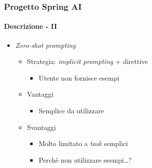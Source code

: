 %
\begin{frame}[t,fragile] \frametitle{Progetto Spring AI}
    \framesubtitle{Descrizione - II}
    {\small
        \begin{itemize}[leftmargin=10pt,align=right]
            \item[\alertedcircled{2}] \textit{Zero-shot prompting}
            \begin{itemize}[leftmargin=10pt,align=right]
                \item[\alert{\faArrowCircleRight}] Strategia: \textit{implicit prompting} + direttive
                \begin{itemize}[leftmargin=10pt,align=right]
                    \item[\alert{\faArrowCircleRight}] Utente \alert{non} fornisce esempi
                \end{itemize}
                \item[\alert{\faArrowCircleRight}] Vantaggi
                \begin{itemize}[leftmargin=10pt,align=right]
                    \item[\alert{\faArrowCircleRight}] Semplice da utilizzare
                \end{itemize}
                \item[\alert{\faArrowCircleRight}] Svantaggi
                \begin{itemize}[leftmargin=10pt,align=right]
                    \item[\alert{\faArrowCircleRight}] Molto limitato a \textit{task} semplici
                    \item[\alert{\faArrowCircleRight}] Perché non utilizzare esempi\ldots?
                \end{itemize}               
            \end{itemize}
        \end{itemize}
    }
\end{frame}
%
